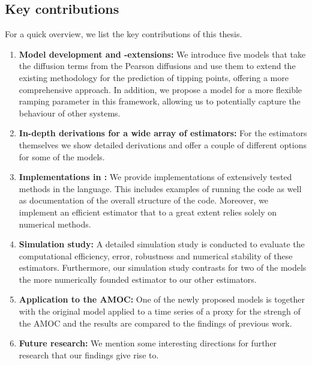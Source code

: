 \subsection{Key contributions}
For a quick overview, we list the key contributions of this thesis.
\begin{enumerate}
    \item \textbf{Model development and -extensions:} We introduce five models that take the diffusion terms from the Pearson diffusions and use them to extend the existing methodology for the prediction of tipping points, offering a more comprehensive approach. In addition, we propose a model for a more flexible ramping parameter in this framework, allowing us to potentially capture the behaviour of other systems.
    \item \textbf{In-depth derivations for a wide array of estimators:} For the estimators themselves we show detailed derivations and offer a couple of different options for some of the models. 
    \item \textbf{Implementations in :} We provide implementations of extensively tested methods in the  language. This includes examples of running the code as well as documentation of the overall structure of the code. Moreover, we implement an efficient estimator that to a great extent relies solely on numerical methods. 
    \item \textbf{Simulation study:} A detailed simulation study is conducted to evaluate the computational efficiency, error, robustness and numerical stability of these estimators. Furthermore, our simulation study contrasts for two of the models the more numerically founded estimator to our other estimators. 
    \item \textbf{Application to the AMOC:} One of the newly proposed models is together with the original model applied to a time series of a proxy for the strengh of the AMOC and the results are compared to the findings of previous work.
    \item \textbf{Future research:} We mention some interesting directions for further research that our findings give rise to.
\end{enumerate}
